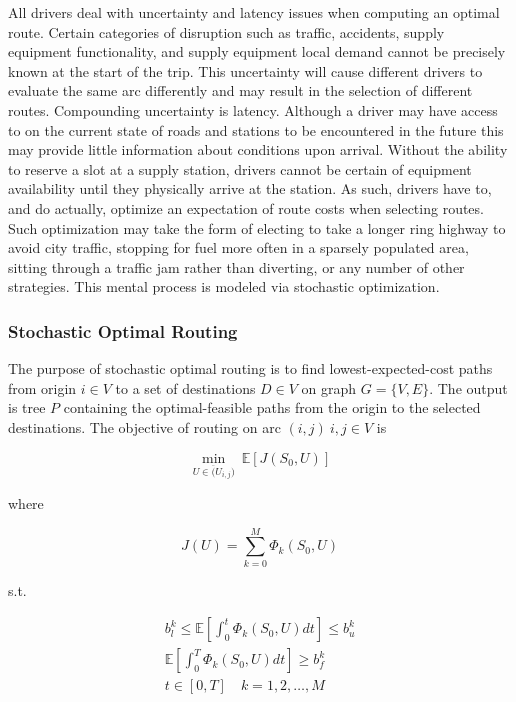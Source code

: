 \documentclass[11pt]{article}
\begin{document}
\begin{multicols}{2}
All drivers deal with uncertainty and latency issues when computing an optimal route. Certain categories of disruption such as traffic, accidents, supply equipment functionality, and supply equipment local demand cannot be precisely known at the start of the trip. This uncertainty will cause different drivers to evaluate the same arc differently and may result in the selection of different routes. Compounding uncertainty is latency. Although a driver may have access to on the current state of roads and stations to be encountered in the future this may provide little information about conditions upon arrival. Without the ability to reserve a slot at a supply station, drivers cannot be certain of equipment availability until they physically arrive at the station. As such, drivers have to, and do actually, optimize an expectation of route costs when selecting routes. Such optimization may take the form of electing to take a longer ring highway to avoid city traffic, stopping for fuel more often in a sparsely populated area, sitting through a traffic jam rather than diverting, or any number of other strategies. This mental process is modeled via stochastic optimization.

\subsubsection*{Stochastic Optimal Routing}

The purpose of stochastic optimal routing is to find lowest-expected-cost paths from origin $i \in V$ to a set of destinations $D \in V$ on graph $G = \{V, E\}$. The output is tree $P$ containing the optimal-feasible paths from the origin to the selected destinations. The objective of routing on arc $(i,j)\ i, j \in V$ is

\begin{equation}
	\min_{U \in \overline({U}_{i,j})}\ \mathbb{E}[J(S_0, U)]
\end{equation}

where

\begin{equation}
	J(U) = \sum_{k = 0}^M \Phi_k(S_0, U)
\end{equation}

s.t.

\begin{gather}	
	b^k_l \leq \mathbb{E}\left[\int_0^t \Phi_k(S_0, U)dt\right] \leq b^k_u\\
	\mathbb{E}\left[\int_0^T \Phi_k(S_0, U)dt\right] \geq b^k_f\\
	 t \in [0, T]\quad k = 1, 2, \dots, M
\end{gather}


\end{multicols}
\end{document}
